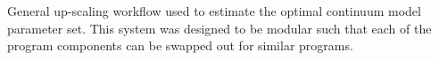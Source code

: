 \label{fig:workflow} General up-scaling workflow used to estimate the optimal continuum model parameter set. This system was designed to be modular such that each of the program components can be swapped out for similar programs. 
